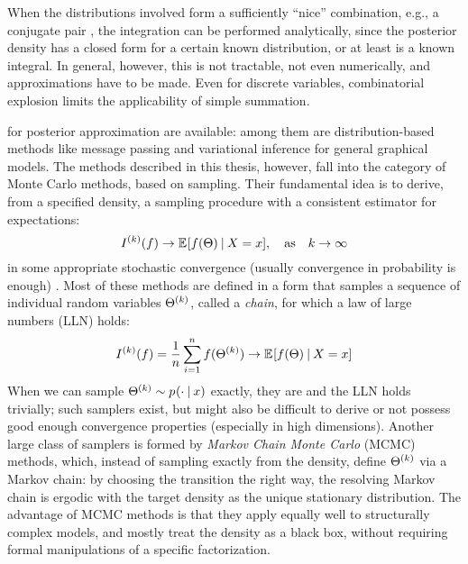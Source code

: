 When the distributions involved form a sufficiently \enquote{nice} combination, e.g., a conjugate
pair , the integration can be performed analytically, since the posterior density has a
closed form for a certain known distribution, or at least is a known integral.  In general, however,
this is not tractable, not even numerically, and approximations have to be made.  Even for discrete
variables, combinatorial explosion limits the applicability of simple summation.

 for posterior approximation are available: among them are
distribution-based methods like message passing and variational inference for general graphical
models.  The methods described in this thesis, however, fall into the category of Monte
Carlo methods, based on sampling. Their fundamental idea is to derive, from a specified density, a
sampling procedure with a consistent estimator for expectations:
\begin{equation}
  \label{eq:mc-methods}
  \kth{I}(f) \to \Exp{f(\Theta) \given X = x}, \quad \text{as} \quad k
  \to \infty
\end{equation}
in some appropriate stochastic convergence (usually convergence in probability is enough)
\parencite[chapter 1]{vihola2020lectures}.  Most of these methods are defined in a form that samples
a sequence of individual random variables \(\Theta^{(k)}\), called a \emph{chain}, for which a law
of large numbers (LLN) holds:
\begin{equation}
  \label{eq:mc-lln}
  \kth{I}(f) = \frac{1}{n} \sum_{i=1}^{n} f(\kth{\Theta}) \to \Exp{f(\Theta) \given X = x}
\end{equation}
When we can sample \(\kth{\Theta} \sim \prob{\cdot \given x}\) exactly, they are \iid{} and the LLN
holds trivially; such samplers exist, but might also be difficult to derive or not possess good
enough convergence properties (especially in high dimensions).  Another large class of samplers is
formed by \emph{Markov Chain Monte Carlo} (MCMC) methods, which, instead of sampling exactly from
the density, define \(\Theta^{(k)}\) via a Markov chain: by choosing the transition the right way,
the resolving Markov chain is ergodic with the target density as the unique stationary distribution.
The advantage of MCMC methods is that they apply equally well to structurally complex models, and
mostly treat the density as a black box, without requiring formal manipulations of a specific
factorization.

